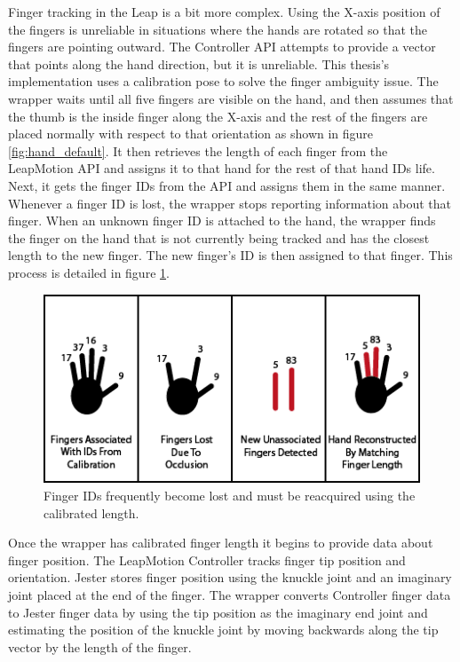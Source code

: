 Finger tracking in the Leap is a bit more complex. Using the X-axis position of the fingers is unreliable in situations where the hands are rotated so that the fingers are pointing outward. The Controller API attempts to provide a vector that points along the hand direction, but it is unreliable. This thesis's implementation uses a calibration pose to solve the finger ambiguity issue. The wrapper waits until all five fingers are visible on the hand, and then assumes that the thumb is the inside finger along the X-axis and the rest of the fingers are placed normally with respect to that orientation as shown in figure \ref{fig:hand_default}. It then retrieves the length of each finger from the LeapMotion API and assigns it to that hand for the rest of that hand IDs life. Next, it gets the finger IDs from the API and assigns them in the same manner. Whenever a finger ID is lost, the wrapper stops reporting information about that finger. When an unknown finger ID is attached to the hand, the wrapper finds the finger on the hand that is not currently being tracked and has the closest length to the new finger. The new finger's ID is then assigned to that finger. This process is detailed in figure \ref{fig:finger_matching}. 

\begin{figure}[]
\centering
\includegraphics[width=.75\textwidth]{figures/fingerAssociation}
\caption{Finger IDs frequently become lost and must be reacquired using the calibrated length.}
\label{fig:finger_matching}
\end{figure}

Once the wrapper has calibrated finger length it begins to provide data about finger position. The LeapMotion Controller tracks finger tip position and orientation. Jester stores finger position using the knuckle joint and an imaginary joint placed at the end of the finger. The wrapper converts Controller finger data to Jester finger data by using the tip position as the imaginary end joint and estimating the position of the knuckle joint by moving backwards along the tip vector by the length of the finger.

